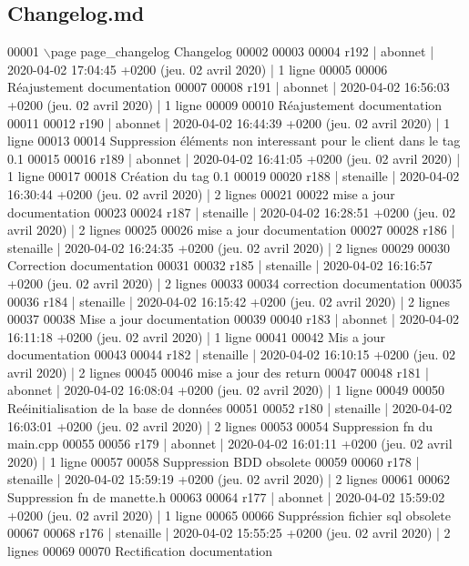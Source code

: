 \hypertarget{_changelog_8md_source}{}\subsection{Changelog.\+md}

\begin{DoxyCode}
00001 \(\backslash\)page page\_changelog Changelog
00002 
00003 
00004 r192 | abonnet | 2020-04-02 17:04:45 +0200 (jeu. 02 avril 2020) | 1 ligne
00005 
00006 Réajustement documentation
00007 
00008 r191 | abonnet | 2020-04-02 16:56:03 +0200 (jeu. 02 avril 2020) | 1 ligne
00009 
00010 Réajustement documentation
00011 
00012 r190 | abonnet | 2020-04-02 16:44:39 +0200 (jeu. 02 avril 2020) | 1 ligne
00013 
00014 Suppression éléments non interessant pour le client dans le tag 0.1
00015 
00016 r189 | abonnet | 2020-04-02 16:41:05 +0200 (jeu. 02 avril 2020) | 1 ligne
00017 
00018 Création du tag 0.1
00019 
00020 r188 | stenaille | 2020-04-02 16:30:44 +0200 (jeu. 02 avril 2020) | 2 lignes
00021 
00022 mise a jour documentation
00023 
00024 r187 | stenaille | 2020-04-02 16:28:51 +0200 (jeu. 02 avril 2020) | 2 lignes
00025 
00026 mise a jour documentation
00027 
00028 r186 | stenaille | 2020-04-02 16:24:35 +0200 (jeu. 02 avril 2020) | 2 lignes
00029 
00030 Correction documentation
00031 
00032 r185 | stenaille | 2020-04-02 16:16:57 +0200 (jeu. 02 avril 2020) | 2 lignes
00033 
00034 correction documentation
00035 
00036 r184 | stenaille | 2020-04-02 16:15:42 +0200 (jeu. 02 avril 2020) | 2 lignes
00037 
00038 Mise a jour documentation
00039 
00040 r183 | abonnet | 2020-04-02 16:11:18 +0200 (jeu. 02 avril 2020) | 1 ligne
00041 
00042 Mis a jour documentation
00043 
00044 r182 | stenaille | 2020-04-02 16:10:15 +0200 (jeu. 02 avril 2020) | 2 lignes
00045 
00046 mise a jour des return
00047 
00048 r181 | abonnet | 2020-04-02 16:08:04 +0200 (jeu. 02 avril 2020) | 1 ligne
00049 
00050 Reéinitialisation de la base de données
00051 
00052 r180 | stenaille | 2020-04-02 16:03:01 +0200 (jeu. 02 avril 2020) | 2 lignes
00053 
00054 Suppression fn du main.cpp
00055 
00056 r179 | abonnet | 2020-04-02 16:01:11 +0200 (jeu. 02 avril 2020) | 1 ligne
00057 
00058 Suppression BDD obsolete
00059 
00060 r178 | stenaille | 2020-04-02 15:59:19 +0200 (jeu. 02 avril 2020) | 2 lignes
00061 
00062 Suppression fn de manette.h
00063 
00064 r177 | abonnet | 2020-04-02 15:59:02 +0200 (jeu. 02 avril 2020) | 1 ligne
00065 
00066 Suppréssion fichier sql obsolete
00067 
00068 r176 | stenaille | 2020-04-02 15:55:25 +0200 (jeu. 02 avril 2020) | 2 lignes
00069 
00070 Rectification documentation

\end{DoxyCode}
